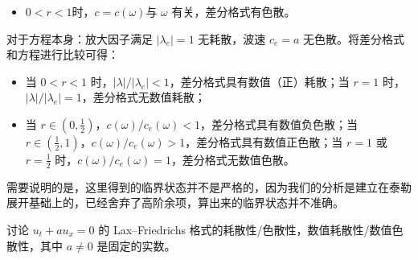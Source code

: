 \begin{solution*}
\begin{itemize}
        \item $0<r<1$时，$c = c(\omega)$与 $\omega$ 有关，差分格式有色散。
    \end{itemize}
    对于方程本身：放大因子满足 $|\lambda_e| = 1$ 无耗散，波速 $c_e = a$ 无色散。将差分格式和方程进行比较可得：
    \begin{itemize}
        \item 当 $0 < r < 1$ 时，$|\lambda| / |\lambda_e|  < 1$，差分格式具有数值（正）耗散；当 $r=1$ 时，$|\lambda| / |\lambda_e| = 1$，差分格式无数值耗散；
        \item 当 $r \in (0,\frac12)$，$c(\omega) / c_e(\omega) < 1$，差分格式具有数值负色散；当 $r \in (\frac12,1)$，$c(\omega) / c_e(\omega) > 1$，差分格式具有数值正色散；当 $r=1$ 或 $r = \frac12$ 时，$c(\omega) / c_e(\omega) = 1$，差分格式无数值色散。
    \end{itemize}
\end{solution*}

\begin{remark}
    需要说明的是，这里得到的临界状态并不是严格的，因为我们的分析是建立在泰勒展开基础上的，已经舍弃了高阶余项，算出来的临界状态并不准确。
\end{remark}

\begin{example}
    讨论 $u_t + a u_x = 0$ 的 Lax–Friedrichs 格式的耗散性/色散性，数值耗散性/数值色散性，其中 $a \neq 0$ 是固定的实数。
\end{example}


